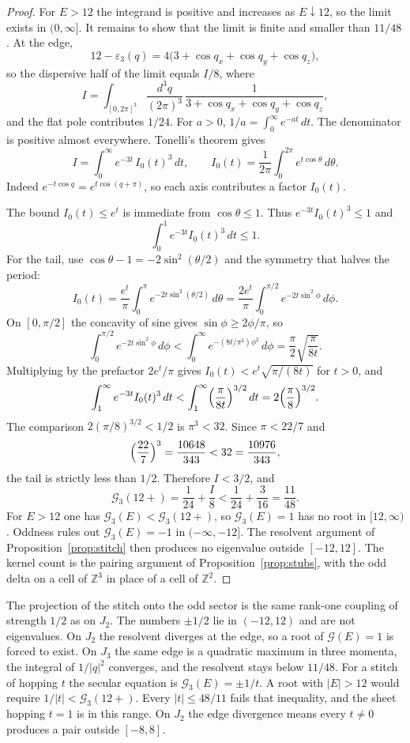 \begin{proof}
For \(E>12\) the integrand is positive and increases as \(E\downarrow 12\),
so the limit exists in \((0,\infty]\).
It remains to show that the limit is finite and smaller than \(11/48\).
At the edge,
\[
12-\varepsilon_3(q)=4\bigl(3+\cos q_x+\cos q_y+\cos q_z\bigr),
\]
so the dispersive half of the limit equals \(I/8\), where
\[
I=\int_{[0,2\pi]^3}\frac{d^3q}{(2\pi)^3}\,
\frac{1}{3+\cos q_x+\cos q_y+\cos q_z},
\]
and the flat pole contributes \(1/24\).
For \(a>0\), \(1/a=\int_0^\infty e^{-at}\,dt\).
The denominator is positive almost everywhere.
Tonelli's theorem gives
\[
I=\int_0^\infty e^{-3t}\,I_0(t)^3\,dt,
\qquad
I_0(t)=\frac{1}{2\pi}\int_0^{2\pi}e^{t\cos\theta}\,d\theta.
\]
Indeed \(e^{-t\cos q}=e^{t\cos(q+\pi)}\), so each axis contributes a factor
\(I_0(t)\).

The bound \(I_0(t)\le e^{t}\) is immediate from \(\cos\theta\le 1\).
Thus \(e^{-3t}I_0(t)^3\le 1\) and
\[
\int_0^1 e^{-3t}I_0(t)^3\,dt\le 1.
\]
For the tail, use \(\cos\theta-1=-2\sin^2(\theta/2)\) and the symmetry that
halves the period:
\[
I_0(t)=\frac{e^{t}}{\pi}\int_0^{\pi}e^{-2t\sin^2(\theta/2)}\,d\theta
=\frac{2e^{t}}{\pi}\int_0^{\pi/2}e^{-2t\sin^2\phi}\,d\phi.
\]
On \([0,\pi/2]\) the concavity of sine gives \(\sin\phi\ge 2\phi/\pi\), so
\[
\int_0^{\pi/2}e^{-2t\sin^2\phi}\,d\phi
<\int_0^{\infty}e^{-(8t/\pi^2)\phi^2}\,d\phi
=\frac{\pi}{2}\sqrt{\frac{\pi}{8t}}.
\]
Multiplying by the prefactor \(2e^{t}/\pi\) gives
\(I_0(t)<e^{t}\sqrt{\pi/(8t)}\) for \(t>0\), and
\[
\int_1^{\infty}e^{-3t}I_0(t)^3\,dt
<\int_1^{\infty}\Bigl(\frac{\pi}{8t}\Bigr)^{3/2}\,dt
=2\Bigl(\frac{\pi}{8}\Bigr)^{3/2}.
\]
The comparison \(2(\pi/8)^{3/2}<1/2\) is \(\pi^3<32\).
Since \(\pi<22/7\) and
\[
\Bigl(\frac{22}{7}\Bigr)^3=\frac{10648}{343}<32=\frac{10976}{343},
\]
the tail is strictly less than \(1/2\).
Therefore \(I<3/2\), and
\[
\mathcal{G}_3(12+)
=\frac{1}{24}+\frac{I}{8}
<\frac{1}{24}+\frac{3}{16}
=\frac{11}{48}.
\]
For \(E>12\) one has \(\mathcal{G}_3(E)<\mathcal{G}_3(12+)\), so
\(\mathcal{G}_3(E)=1\) has no root in \([12,\infty)\).
Oddness rules out \(\mathcal{G}_3(E)=-1\) in \((-\infty,-12]\).
The resolvent argument of Proposition~\ref{prop:stitch} then produces no
eigenvalue outside \([-12,12]\).
The kernel count is the pairing argument of Proposition~\ref{prop:stubs},
with the odd delta on a cell of \(\mathbb{Z}^3\) in place of a cell of \(\mathbb{Z}^2\).
\end{proof}

The projection of the stitch onto the odd sector is the same rank-one
coupling of strength \(1/2\) as on \(J_2\).
The numbers \(\pm 1/2\) lie in \((-12,12)\) and are not eigenvalues.
On \(J_2\) the resolvent diverges at the edge, so a root of
\(\mathcal{G}(E)=1\) is forced to exist.
On \(J_3\) the same edge is a quadratic maximum in three momenta, the
integral of \(1/|q|^2\) converges, and the resolvent stays below \(11/48\).
For a stitch of hopping \(t\) the secular equation is
\(\mathcal{G}_3(E)=\pm 1/t\).
A root with \(|E|>12\) would require \(1/|t|<\mathcal{G}_3(12+)\).
Every \(|t|\le 48/11\) fails that inequality, and the sheet hopping \(t=1\)
is in this range.
On \(J_2\) the edge divergence means every \(t\neq 0\) produces a pair
outside \([-8,8]\).


